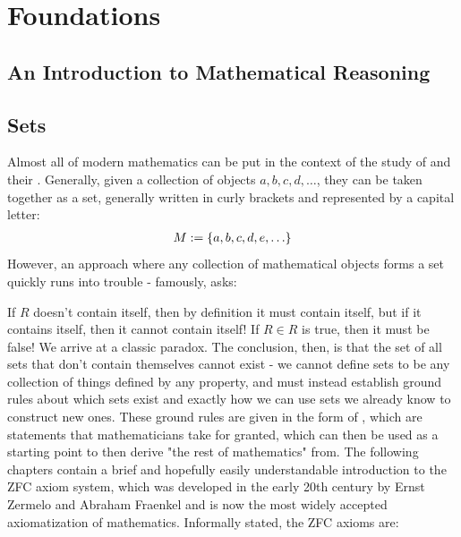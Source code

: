 \part{Foundations}
\parttoc
\chapter{An Introduction to Mathematical Reasoning}
\chapter{Sets}

Almost all of modern mathematics can be put in the context of the study of  and their . Generally, given a collection of objects $a,b,c,d,\hdots$, they can be taken together as a set, generally written in curly brackets and represented by a capital letter:
\begin{align*}
	M := \qty{a,b,c,d,e,\hdots}
\end{align*}
However, an approach where any collection of mathematical objects forms a set quickly runs into trouble - famously,  asks:
\begin{quote}
\end{quote}
If $R$ doesn't contain itself, then by definition it must contain itself, but if it contains itself, then it cannot contain itself! If $R \in R$ is true, then it must be false! We arrive at a classic paradox. The conclusion, then, is that the set of all sets that don't contain themselves cannot exist - we cannot define sets to be any collection of things defined by any property, and must instead establish ground rules about which sets exist and exactly how we can use sets we already know to construct new ones.
\newpar
These ground rules are given in the form of , which are statements that mathematicians take for granted, which can then be used as a starting point to then derive "the rest of mathematics" from. The following chapters contain a brief and hopefully easily understandable introduction to the ZFC axiom system, which was developed in the early 20th century by Ernst Zermelo and Abraham Fraenkel and is now the most widely accepted axiomatization of mathematics. Informally stated, the ZFC axioms are:
